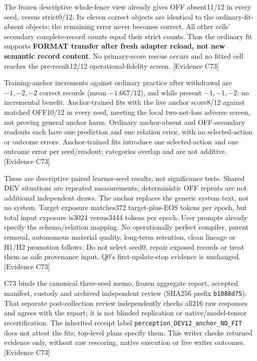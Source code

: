 \documentclass[11pt]{article}
\newcommand{\ev}[1]{\textsf{[Evidence #1]}}
\begin{document}
The frozen descriptive whole-fence view already gives OFF absent11/12 in every
seed, versus strict0/12. Its eleven correct objects are identical to the
ordinary-fit-absent objects; the remaining error never becomes correct. All
other cells' secondary complete-record counts equal their strict counts.
Thus the ordinary fit supports \textbf{FORMAT transfer after fresh adapter
reload, not new semantic record content}. No primary-score rescue occurs and
no fitted cell reaches the pre-result12/12 operational-fidelity screen. \ev{C73}

Training-anchor increments against ordinary practice after withdrawal are
$-1,-2,-2$ correct records (mean $-1.667/12$), and while present $-1,-1,-2$:
no incremental benefit. Anchor-trained fits with the live anchor score8/12
against matched OFF10/12 in every seed, meeting the local two-net-loss adverse
screen, not proving general anchor harm. Ordinary anchor-absent and OFF-secondary
readouts each have one prediction and one relation error, with no selected-action
or outcome errors. Anchor-trained fits introduce one selected-action and one
outcome error per seed/readout; categories overlap and are not additive. \ev{C73}

These are descriptive paired learner-seed results, not significance tests.
Shared DEV situations are repeated measurements; deterministic OFF repeats are
not additional independent draws. The anchor replaces the generic system text,
not no system. Target exposure matches372 target-plus-EOS tokens per epoch,
but total input exposure is3024 versus3444 tokens per epoch. User prompts already
specify the schema/relation mapping. No operationally perfect compiler, parent
removal, autonomous material quality, long-term retention, clean lineage or
H1/H2 promotion follows. Do not select seed0, repair exposed records or treat
them as safe provenance input. Q0's first-update-stop evidence is unchanged. \ev{C73}

C73 binds the canonical three-seed memo, frozen aggregate report, accepted
manifest, custody and archived independent review (SHA256 prefix
\texttt{b1088d75}). That separate post-collection review independently checks
all216 raw responses and agrees with the report; it is not blinded replication
or native/model-tensor recertification. The inherited receipt label
\texttt{perception\_DEV12\_anchor\_NO\_FIT} does not attest the fits; top-level
plans specify them. This writer checks returned evidence only, without raw
rescoring, native execution or live writer outcomes. \ev{C73}
\end{document}

